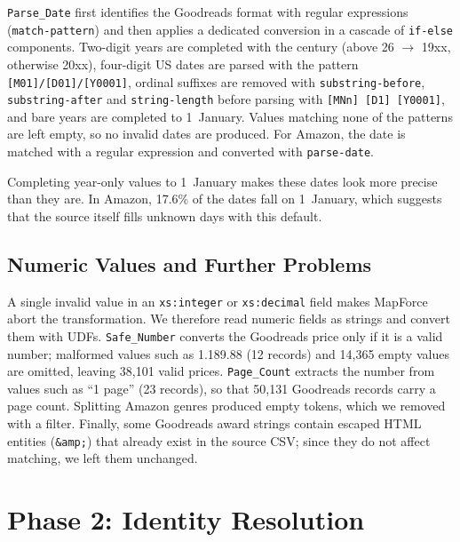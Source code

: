 \documentclass[runningheads]{llncs}
\begin{document}
\texttt{Parse\_Date} first identifies the Goodreads format with regular
expressions (\texttt{match-pattern}) and then applies a dedicated conversion
in a cascade of \texttt{if-else} components. Two-digit years are completed
with the century (above 26 $\rightarrow$ 19xx, otherwise 20xx), four-digit US
dates are parsed with the pattern \texttt{[M01]/[D01]/[Y0001]}, ordinal
suffixes are removed with \texttt{substring-before}, \texttt{substring-after}
and \texttt{string-length} before parsing with \texttt{[MNn] [D1] [Y0001]},
and bare years are completed to 1~January. Values matching none of the
patterns are left empty, so no invalid dates are produced. For Amazon, the
date is matched with a regular expression and converted with
\texttt{parse-date}. %

Completing year-only values to 1~January makes these dates look more precise
than they are. In Amazon, 17.6\% of the dates fall on 1~January, which
suggests that the source itself fills unknown days with this default.

\subsection{Numeric Values and Further Problems}
A single invalid value in an \texttt{xs:integer} or \texttt{xs:decimal} field
makes MapForce abort the transformation. We therefore read numeric fields as
strings and convert them with UDFs. \texttt{Safe\_Number} converts the
Goodreads price only if it is a valid number; malformed values such as
1.189.88 (12 records) and 14,365 empty values are omitted, leaving 38,101
valid prices. \texttt{Page\_Count} extracts the number from values such as
``1 page'' (23 records), so that 50,131 Goodreads records carry a page count.
Splitting Amazon genres produced empty tokens, which we removed with a
filter. Finally, some Goodreads award strings contain escaped HTML entities
(\texttt{\&amp;}) that already exist in the source CSV; since they do not
affect matching, we left them unchanged.

\section{Phase 2: Identity Resolution}\label{sec:identityres}
\end{document}
